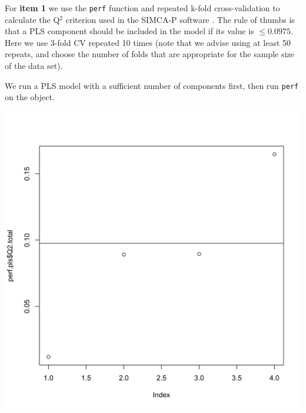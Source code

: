 \documentclass[]{book}
\newenvironment{Shaded}{\begin{snugshade}}{\end{snugshade}}
\newcommand{\CommentTok}[1]{\textcolor[rgb]{0.56,0.35,0.01}{\textit{#1}}}
\newcommand{\DataTypeTok}[1]{\textcolor[rgb]{0.13,0.29,0.53}{#1}}
\newcommand{\DecValTok}[1]{\textcolor[rgb]{0.00,0.00,0.81}{#1}}
\newcommand{\FloatTok}[1]{\textcolor[rgb]{0.00,0.00,0.81}{#1}}
\newcommand{\KeywordTok}[1]{\textcolor[rgb]{0.13,0.29,0.53}{\textbf{#1}}}
\newcommand{\NormalTok}[1]{#1}
\newcommand{\OperatorTok}[1]{\textcolor[rgb]{0.81,0.36,0.00}{\textbf{#1}}}
\newcommand{\OtherTok}[1]{\textcolor[rgb]{0.56,0.35,0.01}{#1}}
\newcommand{\StringTok}[1]{\textcolor[rgb]{0.31,0.60,0.02}{#1}}
\begin{document}
For \textbf{item 1} we use the \texttt{perf} function and repeated k-fold cross-validation to calculate the Q\(^2\) criterion used in the SIMCA-P software \citep{Ume96}. The rule of thumbs is that a PLS component should be included in the model if its value is \(\leq 0.0975\). Here we use 3-fold CV repeated 10 times (note that we advise using at least 50 repeats, and choose the number of folds that are appropriate for the sample size of the data set).

We run a PLS model with a sufficient number of components first, then run \texttt{perf} on the object.

\begin{Shaded}
\end{Shaded}

\begin{center}\includegraphics[width=0.75\linewidth,]{Figures/05-pls-perf-1} \end{center}
\end{document}
